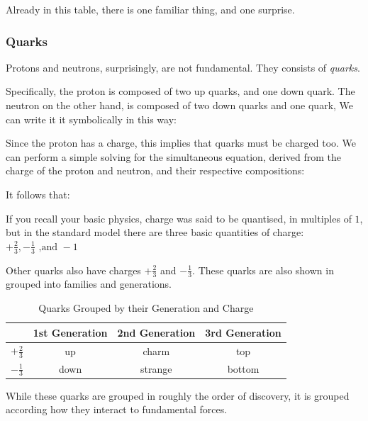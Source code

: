 Already in this table, there is one familiar thing, and one surprise.

\subsubsection{Quarks}
Protons and neutrons, surprisingly, are not fundamental. They consists of \emph{quarks}.

Specifically, the proton is composed of two up quarks, and one down quark. The neutron on the other hand, is composed of two down quarks and one quark, We can write it it symbolically in this way:

Since the proton has a charge, this implies that quarks must be charged too. We can perform a simple solving for the simultaneous equation, derived from the charge of the proton and neutron, and their respective compositions:


It follows that:


If you recall your basic physics, charge was said to be quantised, in multiples of $1$, but in the standard model there are three basic quantities of charge: $+\frac{2}{3},-\frac{1}{3}\text{ ,and } -1$

Other quarks also have charges $+\frac{2}{3}$ and $-\frac{1}{3}$. These quarks are also shown in grouped into families and generations.

\begin{table}[http]
\begin{center}
\begin{tabular}{|c | c c c|}
\hline & 1st Generation & 2nd Generation & 3rd Generation \\ \hline
$+\frac{2}{3}$ & up & charm & top\\
$-\frac{1}{3}$ & down & strange & bottom \\ \hline
\end{tabular}
\end{center}
\label{quarkgroup::table}
\caption{Quarks Grouped by their Generation and Charge}
\end{table}%

While these quarks are grouped in roughly the order of discovery, it is grouped according how they interact to fundamental forces.

